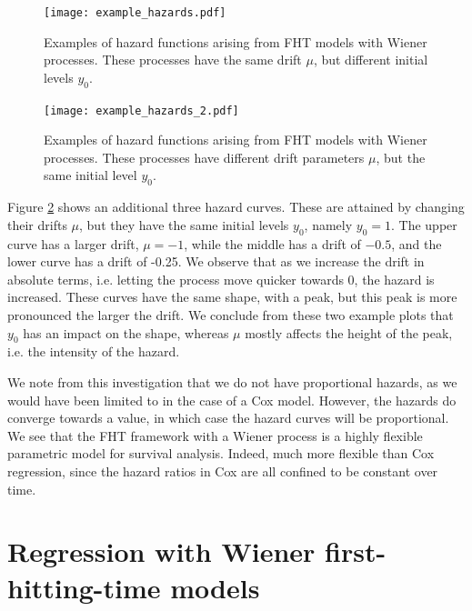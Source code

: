 \begin{figure}
\label{plot:hazards1}
\caption{Examples of hazard functions arising from FHT models with Wiener processes. These processes have the same drift $\mu$, but different initial levels $y_0$.}
\centering
\texttt{[image: example\_hazards.pdf]}
\end{figure}

\begin{figure}
\label{plot:hazards2}
\caption{Examples of hazard functions arising from FHT models with Wiener processes. These processes have different drift parameters $\mu$, but the same initial level $y_0$.}
\centering
\texttt{[image: example\_hazards\_2.pdf]}
\end{figure}

Figure \ref{plot:hazards2} shows an additional three hazard curves.
These are attained by changing their drifts $\mu$, but they have the same initial levels $y_0$, namely $y_0=1$.
The upper curve has a larger drift, $\mu=-1$, while the middle has a drift of $-0.5$, and the lower curve has a drift of -0.25.
We observe that as we increase the drift in absolute terms, i.e. letting the process move quicker towards 0, the hazard is increased.
These curves have the same shape, with a peak, but this peak is more pronounced the larger the drift.
We conclude from these two example plots that $y_0$ has an impact on the shape, whereas $\mu$ mostly affects the height of the peak, i.e. the intensity of the hazard.

We note from this investigation that we do not have proportional hazards, as we would have been limited to in the case of a Cox model.
However, the hazards do converge towards a value, in which case the hazard curves will be proportional.
We see that the FHT framework with a Wiener process is a highly flexible parametric model for survival analysis. Indeed, much more flexible than Cox regression, since the hazard ratios in Cox are all confined to be constant over time.

\section{Regression with Wiener first-hitting-time models}
